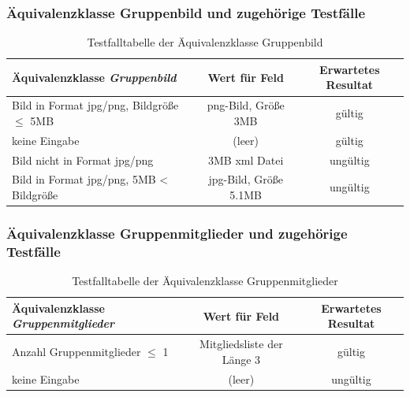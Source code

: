 	\subsubsection{Äquivalenzklasse Gruppenbild und zugehörige Testfälle}
			\begin{table}[H]
		\centering
		\begin{tabular}{l|c|c}
			\textbf{Äquivalenzklasse \textit{Gruppenbild}} &\textbf{Wert für Feld}  &\textbf {Erwartetes Resultat} \\  
			\hline
			Bild in Format jpg/png, Bildgröße \(\leq\) 5MB & png-Bild, Größe 3MB &gültig  \\  
			keine Eingabe &(leer)  & gültig \\  
			Bild nicht in Format jpg/png & 3MB xml Datei & ungültig \\  
			Bild in Format jpg/png, 5MB < Bildgröße  & jpg-Bild, Größe 5.1MB &ungültig  \\  
		\end{tabular}
		\caption{Testfalltabelle der Äquivalenzklasse Gruppenbild}
	\end{table}
	\noindent
	\subsubsection{Äquivalenzklasse Gruppenmitglieder und zugehörige Testfälle}
		\begin{table}[H]
		\centering
		\begin{tabular}{l|c|c}
			\textbf{Äquivalenzklasse \textit{Gruppenmitglieder}} &\textbf{Wert für Feld}  &\textbf {Erwartetes Resultat} \\  
			\hline
			Anzahl Gruppenmitglieder \(\leq\) 1 & Mitgliedsliste der Länge 3 &gültig  \\  
			keine Eingabe &(leer)  & ungültig \\    
		\end{tabular}
		\caption{Testfalltabelle der Äquivalenzklasse Gruppenmitglieder}
	\end{table}
	\noindent

